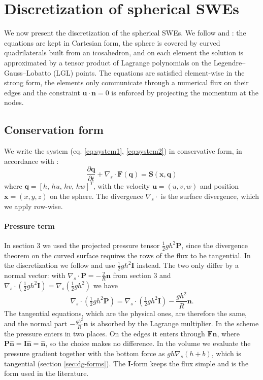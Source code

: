 \section{Discretization of spherical SWEs}
We now present the discretization of the spherical SWEs. We follow \cite{GIRALDO2002499} and \cite{bonev2018discontinuous}: the equations are kept in Cartesian form, the sphere is covered by curved quadrilaterals built from an icosahedron, and on each element the solution is approximated by a tensor product of Lagrange polynomials on the Legendre--Gauss--Lobatto (LGL) points. The equations are satisfied element-wise in the strong form, the elements only communicate through a numerical flux on their edges and the constraint $\mathbf{u}\cdot\mathbf{n} = 0$ is enforced by projecting the momentum at the nodes. 


\subsection{Conservation form}\label{sec:dg-conservation}
We write the system (eq. \ref{eq:system1}, \ref{eq:system2}) in conservative form, in accordance with \cite{GIRALDO2002499}:
\begin{equation}\label{eq:conservation}
    \frac{\partial \mathbf{q}}{\partial t} + \nabla_s\cdot \mathbf{F}(\mathbf{q}) = \mathbf{S}(\mathbf{x}, \mathbf{q})
\end{equation}
where $\mathbf{q} = [h,\, hu,\, hv,\, hw]^T$, with the velocity $\mathbf{u} = (u,v,w)$ and position $\mathbf{x} = (x,y,z)$ on the sphere. The divergence $\nabla_s\cdot$ is the surface divergence, which we apply row-wise.

\paragraph{Pressure term}
In section 3 we used the projected pressure tensor $\frac12gh^2\mathbf{P}$, since the divergence theorem on the curved surface requires the rows of the flux to be tangential. In the discretization we follow \cite{GIRALDO2002499,bonev2018discontinuous} and use $\frac12gh^2\mathbf{I}$ instead. The two only differ by a normal vector: with $\nabla_s\cdot\mathbf{P} = -\frac{2}{R}\mathbf{n}$ from section 3 and $\nabla_s\cdot(\frac12gh^2\mathbf{I}) = \nabla_s(\frac12gh^2)$ we have
\begin{equation}\label{eq:dg-PvsI}
    \nabla_s\cdot\left(\tfrac12gh^2\mathbf{P}\right) = \nabla_s\cdot\left(\tfrac12gh^2\mathbf{I}\right) - \frac{gh^2}{R}\mathbf{n}.
\end{equation}
The tangential equations, which are the physical ones, are therefore the same, and the normal part $-\frac{gh^2}{R}\mathbf{n}$ is absorbed by the Lagrange multiplier. In the scheme the pressure enters in two places. On the edges it enters through $\mathbf{F}\hat{\mathbf{n}}$, where $\mathbf{P}\hat{\mathbf{n}} = \mathbf{I}\hat{\mathbf{n}} = \hat{\mathbf{n}}$, so the choice makes no difference. In the volume we evaluate the pressure gradient together with the bottom force as $gh\nabla_s(h + b)$, which is tangential (section \ref{sec:dg-forms}). The $\mathbf{I}$-form keeps the flux simple and is the form used in the literature.

